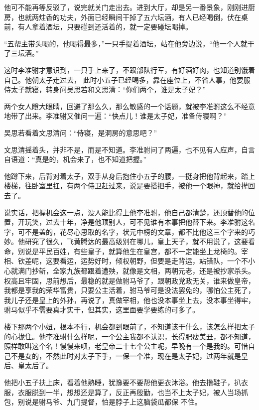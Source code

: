 他可不能再等反驳了，说完就关门走出去。进到大厅，却是另一番景象，刚刚进厨房，也就两炷香的功夫，外面已经瞬间干掉了五六坛酒，有人已经喝倒，伏在桌前，有人拿着酒坛，只要碰到还活着的，就一定要碰坛喝掉。

“五帮主带头喝的，他喝得最多，”一只手提着酒坛，站在他旁边说，“他一个人就干了三坛酒。”

这时李准驸才意识到，一只手上来了，不跟部队行军，有好酒好肉，也知道别饿着自己。他朝太子走过去，
此时小五子已经喝多，靠在座位上，不省人事，他要服侍太子就寝，转身问吴思若和文思清：“你们两个，谁是太子妃？”

两个女人瞪大眼睛，回避了那么久，那么敏感的一个话题，就被李准驸这么不经意地带了出来。李准驸又催问一遍：“快点儿！谁是太子妃，准备侍寝啊？”

吴思若看着文思清问：“侍寝，是洞房的意思吧？”

文思清摇着头，并非不是，而是不知道。李准驸问了两遍，也不见有人应声，自言自语道：“真是的，机会来了，也不知道把握。”

他蹲下来，后背对着太子，双手从身后抱住小五子的腰，一挺身把他背起来，踏上楼梯，往卧室里扛，有两个侍卫赶过来，说是要搭把手，被他一个眼神，就给撵回去了。

说实话，把握机会这一点，没人能比得上他李准驸，他自己都清楚，还顶替他的位置，开玩笑，过去十年，净是他顶别人，可不见谁有本事把他替下来。李准驸这名字，可不是盖的，花尽心思取的名字，状元中榜的文章，都不比他这三个字来的巧妙。他研究了很久，飞黄腾达的最高级别在哪儿，皇上天子，就不用说了，这要看命，别说是平民百姓，有些皇子，就算他生在皇宫，都不一定能坐上龙椅的。宰相、钦差呢，这要看运，运势好时，倾权朝野，但要是走背运，站错队，一个不小心就满门抄斩，全家九族都跟着遭殃，就像是文相，两朝元老，还是被抄家杀头。权高且牢固，思前想后，最稳的就是做驸马爷了，跟朝政党政无关，谁来做皇帝，我都是享我的荣华富贵，只要公主活着，驸马爷可是没法罢免的，哪怕公主死了，我儿子还是皇上的外孙，再说了，真做宰相，他也没本事坐上去，没本事坐得牢，驸马似乎不需要真才实干，但其实，这里面要学要练的可多了。

楼下那两个小妞，根本不行，机会都到眼前了，不知道该干什么，该怎么样把太子的心拢住。他李准驸什么样呢，一个公主我都不认识，长得肥瘦美丑，都不知道，照样敢叫这个名！慢慢来呗，老皇帝二十七个公主呢，早晚有一个是我的。可惜自己不是女的，不然此时对太子下手，一保一个准，现在是太子妃，过两年就是皇后、皇太后了。

他把小五子扶上床，看着他熟睡，犹豫要不要帮他更衣沐浴。他去撸鞋子，扒衣服，衣服脱到一半，想想还是算了，反正再殷勤，也当不上太子妃，被人当场抓包，别说是驸马爷、九门提督，怕是脖子上这脑袋瓜都保
不住。


